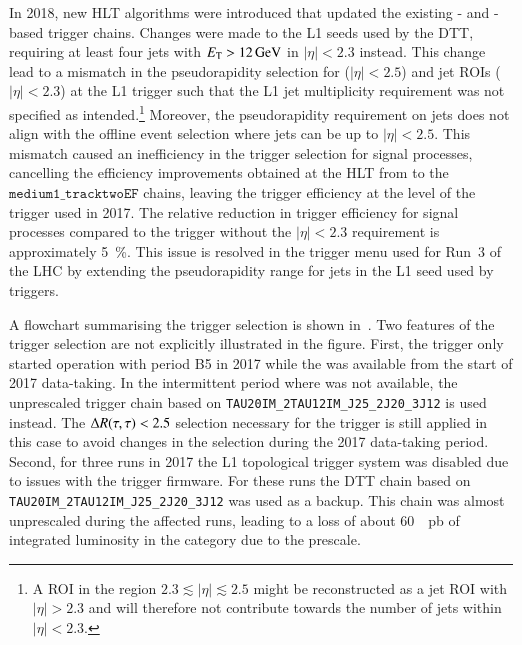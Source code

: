 In 2018, new \tauhadvis HLT algorithms were introduced that updated
the existing \LOneTopo- and \FourJTwelve-based trigger chains. Changes
were made to the L1 seeds used by the \FourJTwelve DTT, requiring at
least four jets with $\ET > \SI{12}{\GeV}$ in $|\eta| < 2.3$
instead. This change lead to a mismatch in the pseudorapidity
selection for \tauhadvis ($|\eta| < 2.5$) and jet ROIs
($|\eta| < 2.3$) at the L1 trigger such that the L1 jet multiplicity
requirement was not specified as intended.\footnote{A \tauhadvis ROI
  in the region $2.3 \lesssim |\eta| \lesssim 2.5$ might be
  reconstructed as a jet ROI with $|\eta| > 2.3$ and will therefore
  not contribute towards the number of jets within $|\eta| < 2.3$.}
Moreover, the pseudorapidity requirement on jets does not align with
the offline event selection where jets can be \btagged up to
$|\eta| < 2.5$. This mismatch caused an inefficiency in the trigger
selection for signal processes, cancelling the efficiency improvements
obtained at the HLT from to the $\texttt{medium1\_tracktwoEF}$ chains,
leaving the trigger efficiency at the level of the \FourJTwelve
trigger used in 2017. The relative reduction in trigger efficiency for
signal processes compared to the \FourJTwelve trigger without the
$|\eta| < 2.3$ requirement is approximately \SI{5}{\percent}. This
issue is resolved in the trigger menu used for Run~3 of the LHC by
extending the pseudorapidity range for jets in the L1 seed used by
\FourJTwelve triggers.

A flowchart summarising the trigger selection is shown
in~. Two features of the trigger
selection are not explicitly illustrated in the figure. First, the
\LOneTopo trigger only started operation with period B5 in 2017 while
the \FourJTwelve was available from the start of 2017 data-taking. In
the intermittent period where \LOneTopo was not available, the
unprescaled \tauhadvis trigger chain based on
\texttt{TAU20IM\_2TAU12IM\_J25\_2J20\_3J12} is used instead. The
$\Delta R(\tau, \tau) < 2.5$ selection necessary for the \LOneTopo trigger is
still applied in this case to avoid changes in the selection during
the 2017 data-taking period. Second, for three runs in 2017 the L1
topological trigger system was disabled due to issues with the trigger
firmware. For these runs the DTT chain based on
\texttt{TAU20IM\_2TAU12IM\_J25\_2J20\_3J12} was used as a backup. This
chain was almost unprescaled during the affected runs, leading to a
loss of about \SI{60}{\per\pico\barn} of integrated luminosity in the
\LOneTopo category due to the prescale.

